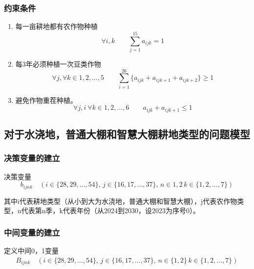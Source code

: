 \documentclass[a4paper]{article}
\begin{document}
	\subsubsection{约束条件}
	\begin{enumerate}[]
		\item 每一亩耕地都有农作物种植
		\begin{equation*}
			\forall i,k    \quad \quad \sum_{j = 1}^{15} a_{ijk} = 1
		\end{equation*}
		
		\item 每3年必须种植一次豆类作物
		\begin{equation*}
			\forall j, \forall k \in {1,2, \dots, 5}    \quad \quad \sum_{i = 1}^{26} \{ a_{ijk} + a_{ij{k+1}} + a_{ij{k+2}}\}\geq 1 
		\end{equation*}
		
		\item 避免作物重茬种植。
		\begin{equation*}
			\forall j,i \ \forall k \in {1,2, \dots, 6}    \quad  \quad  a_{ijk} + a_{ij{k+1}} \leq 1 
		\end{equation*}
	\end{enumerate}
	
	
	\subsection{对于水浇地，普通大棚和智慧大棚耕地类型的问题模型}
	\subsubsection{决策变量的建立}
	决策变量 
	\begin{equation*}
		b_{ijnk} \quad (i \in \{28, 29, \dots, 54\}, \, j \in \{16, 17, \dots, 37\}, \,n \in {1,2}  \,k \in \{1, 2, \dots, 7\})
	\end{equation*}
	
	其中i代表耕地类型（从小到大为水浇地，普通大棚和智慧大棚），j代表农作物类型，n代表第n季，k代表年份（从2024到2030，设2023为序号0）。
	
	\subsubsection{中间变量的建立}
	定义中间0，1变量 
		\begin{align*}
		B_{ijnk} \quad (i \in \{28, 29, \dots, 54\}, \, j \in \{16, 17, \dots, 37\}, \,n \in \{1,2\}  \,k \in \{1, 2, \dots, 7\}) 
		\end{align*}
		
\end{document}
